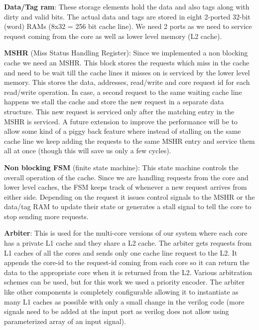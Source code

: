 
\textbf{Data/Tag ram}: These storage elements hold the data and also tags along with dirty and valid bits. The actual data and tags are stored in eight 2-ported 32-bit (word) RAMs (8x32 = 256 bit cache line). We need 2 ports as we need to service request coming from the core as well as lower level memory (L2 cache). 

\textbf{MSHR} (Miss Status Handling Register): Since we implemented a non blocking cache we need an MSHR. This block stores the requests which miss in the cache and need to be wait till the cache lines it misses on is serviced by the lower level memory. This stores the data, addresses, read/write and core request id for each read/write operation. In case, a second request to the same waiting cache line happens we stall the cache and store the new request in a separate data structure. This new request is serviced only after the matching entry in the MSHR is serviced. A future extension to improve the performance will be to allow some kind of a piggy back feature where instead of stalling on the same cache line we keep adding the requests to the same MSHR entry and service them all at once (though this will save us only a few cycles).

\textbf{Non blocking FSM} (finite state machine): This state machine controls the overall operation of the cache. Since we are handling requests from the core and lower level caches, the FSM keeps track of whenever a new request arrives from either side. Depending on the request it issues control signals to the MSHR or the data/tag RAM to update their state or generates a stall signal to tell the core to stop sending more requests.

\textbf{Arbiter}: This is used for the multi-core versions of our system where each core has a private L1 cache and they share a L2 cache. The arbiter gets requests from L1 caches of all the cores and sends only one cache line request to the L2. It appends the core-id to the request-id coming from each core so it can return the data to the appropriate core when it is returned from the L2. Various arbitration schemes can be used, but for this work we used a priority encoder. The arbiter like other components is completely configurable allowing it to instantiate as many L1 caches as possible with only a small change in the verilog code (more signals need to be added at the input port as verilog does not allow using parameterized array of an input signal). %

